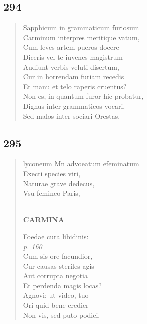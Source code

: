 \documentclass[11pt, a4paper]{report}
\begin{document}
            \subsection*{294}
      \begin{verse}
      Sapphicum in grammaticum furiosum \\ Carminum interpres meritique vatum, \\ Cum leves artem pueros docere \\ Diceris vel te iuvenes magistrum \\ Audiunt verbis veluti disertum, \\ Cur in horrendam furiam recedis \\ Et manu et telo raperis cruentus? \\ Non es, in quantum furor hic probatur, \\ Dignus inter grammaticos vocari, \\ Sed malos inter sociari Orestas. \\ 
      \end{verse}
  
            \subsection*{295}
      \begin{verse}
      lyconeum Mn advoeatum efeminatum \\ Execti species viri, \\ Naturae grave dedecus, \\ Vsu femineo Paris, \\ 
        ﻿\pagebreak 
    \begin{center} \textbf{CARMINA} \end{center} \marginpar{[252]} Foedae cura libidinis: \\ \textit{p. 160} \\ Cum sis ore facundior, \\ Cur causas steriles agis \\ Aut corrupta negotia \\ Et perdenda magis locas? \\ Agnovi: ut video, tuo \\ Ori quid bene credier \\ Non vis, sed puto podici. \\ 
      \end{verse}
  
\end{document}
